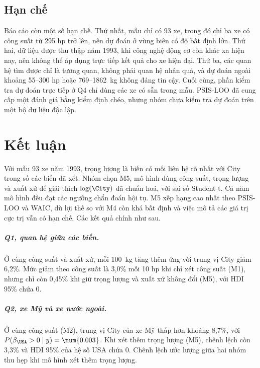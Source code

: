 \documentclass[12pt,a4paper]{report}
\begin{document}

\section{Hạn chế}
\label{sec:limits}

Báo cáo còn một số hạn chế. Thứ nhất, mẫu chỉ có 93 xe, trong đó chỉ ba xe có
công suất từ 295 hp trở lên, nên dự đoán ở vùng biên có độ bất định lớn. Thứ
hai, dữ liệu được thu thập năm 1993, khi công nghệ động cơ còn khác xa hiện nay,
nên không thể áp dụng trực tiếp kết quả cho xe hiện đại. Thứ ba, các quan hệ tìm
được chỉ là tương quan, không phải quan hệ nhân quả, và dự đoán ngoài khoảng
55--300 hp hoặc 769--\SI{1862}{kg} không đáng tin cậy. Cuối cùng, phần kiểm tra
dự đoán trực tiếp ở Q4 chỉ dùng các xe có sẵn trong mẫu. PSIS-LOO đã cung cấp
một đánh giá bằng kiểm định chéo, nhưng nhóm chưa kiểm tra dự đoán trên một
bộ dữ liệu độc lập.

\chapter{Kết luận}
\label{sec:conclusion}

Với mẫu 93 xe năm 1993, trọng lượng là biến có mối liên hệ rõ nhất với City
trong số các biến đã xét. Nhóm chọn M5, mô hình dùng công suất, trọng lượng và
xuất xứ để giải thích $\log(\City)$ đã chuẩn hoá, với sai số Student-t. Cả năm
mô hình đều đạt các ngưỡng chẩn đoán hội tụ. M5 xếp hạng cao nhất theo PSIS-LOO
và WAIC, dù lợi thế so với M4 còn khá bất định và việc mô tả các giá trị cực
trị vẫn có hạn chế. Các kết quả chính như sau.

\paragraph{Q1, quan hệ giữa các biến.} Ở cùng công suất và xuất xứ, mỗi
\SI{100}{kg} tăng thêm ứng với trung vị City giảm 6{,}2\%. Mức giảm theo công
suất là 3{,}0\% mỗi 10 hp khi chỉ xét công suất (M1), nhưng chỉ còn 0{,}45\%
khi giữ trọng lượng và xuất xứ không đổi (M5), với HDI 95\% chứa 0.

\paragraph{Q2, xe Mỹ và xe nước ngoài.} Ở cùng công suất (M2), trung vị City
của xe Mỹ thấp hơn khoảng 8{,}7\%, với $P(\beta_{\USA} > 0 \mid y) =
\num{0.003}$. Khi xét thêm trọng lượng (M5), chênh lệch còn 3{,}3\% và HDI 95\%
của hệ số USA chứa 0. Chênh lệch ước lượng giữa hai nhóm thu hẹp khi mô hình
xét thêm trọng lượng.
\end{document}
